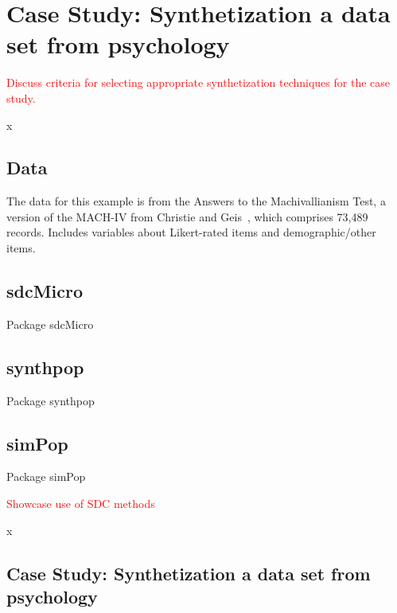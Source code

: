 \documentclass{article}
\begin{document}
\section{Case Study: Synthetization a data set from psychology}

\textcolor{red}{Discuss criteria for selecting appropriate synthetization techniques for the case study.}

x

\subsection{Data}

The data for this example is from the Answers to the Machivallianism Test, a version of the MACH-IV from Christie and Geis~\cite{Data}, which comprises 73,489 records.
Includes variables about Likert-rated items and demographic/other items.

\subsection{sdcMicro}

Package sdcMicro~\cite{2024_Sdcmicro}

\subsection{synthpop}

Package synthpop~\cite{2022_Synthpop}

\subsection{simPop}

Package simPop~\cite{2022_Simpop}

\textcolor{red}{Showcase use of SDC methods}

x

\subsection{Case Study: Synthetization a data set from psychology}



\end{document}
